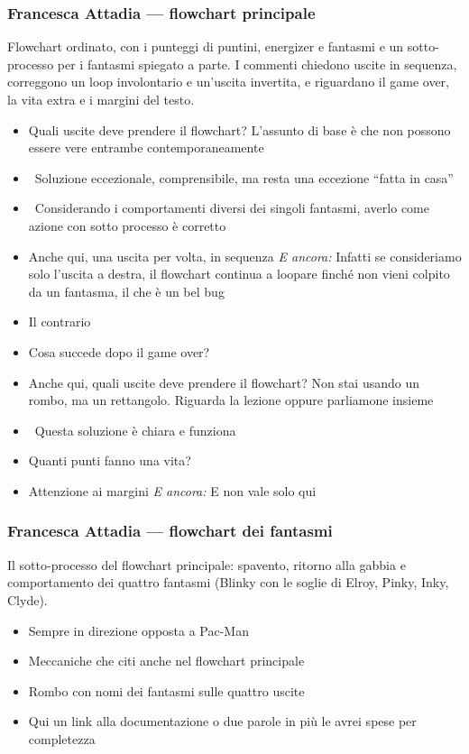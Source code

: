 \subsubsection{Francesca Attadia --- flowchart principale}
Flowchart ordinato, con i punteggi di puntini, energizer e fantasmi e un
sotto-processo per i fantasmi spiegato a parte. I commenti chiedono uscite in
sequenza, correggono un loop involontario e un'uscita invertita, e
riguardano il game over, la vita extra e i margini del testo.
{\small
\begin{itemize}
  \item Quali uscite deve prendere il flowchart? L'assunto di base è che non possono essere vere entrambe contemporaneamente
  \item \rvBene\ Soluzione eccezionale, comprensibile, ma resta una eccezione ``fatta in casa''
  \item {} \rvBene\ Considerando i comportamenti diversi dei singoli fantasmi, averlo come azione con sotto processo è corretto
  \item {} Anche qui, una uscita per volta, in sequenza \emph{E ancora:} Infatti se consideriamo solo l'uscita a destra, il flowchart continua a loopare finché non vieni colpito da un fantasma, il che è un bel bug
  \item {} Il contrario
  \item {} Cosa succede dopo il game over?
  \item Anche qui, quali uscite deve prendere il flowchart? Non stai usando un rombo, ma un rettangolo. Riguarda la lezione oppure parliamone insieme
  \item \rvBene\ Questa soluzione è chiara e funziona
  \item Quanti punti fanno una vita?
  \item Attenzione ai margini \emph{E ancora:} E non vale solo qui
\end{itemize}
}

\subsubsection{Francesca Attadia --- flowchart dei fantasmi}
Il sotto-processo del flowchart principale: spavento, ritorno alla gabbia e
comportamento dei quattro fantasmi (Blinky con le soglie di Elroy, Pinky,
Inky, Clyde).
{\small
\begin{itemize}
  \item {} Sempre in direzione opposta a Pac-Man
  \item Meccaniche che citi anche nel flowchart principale
  \item {} Rombo con nomi dei fantasmi sulle quattro uscite
  \item Qui un link alla documentazione o due parole in più le avrei spese per completezza
\end{itemize}
}

